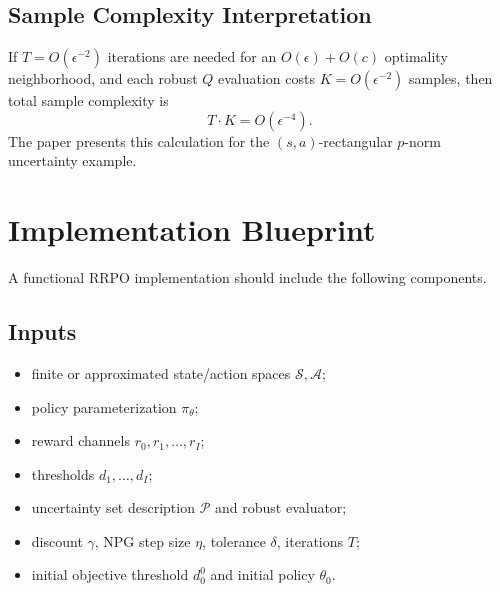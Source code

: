 \documentclass[11pt]{article}
\newcommand{\Sset}{\mathcal S}
\newcommand{\Aset}{\mathcal A}
\newcommand{\Pset}{\mathcal P}
\newcommand{\1}{\mathbf 1}
\begin{document}
\subsection{Sample Complexity Interpretation}
If $T=O(\epsilon^{-2})$ iterations are needed for an $O(\epsilon)+O(c)$ optimality neighborhood, and each robust $Q$ evaluation costs $K=O(\epsilon^{-2})$ samples, then total sample complexity is
\begin{equation}
    T\cdot K=O(\epsilon^{-4}).
\end{equation}
The paper presents this calculation for the $(s,a)$-rectangular $p$-norm uncertainty example.

\section{Implementation Blueprint}
A functional RRPO implementation should include the following components.

\subsection{Inputs}
\begin{itemize}[leftmargin=2em]
    \item finite or approximated state/action spaces $\Sset,\Aset$;
    \item policy parameterization $\pi_\theta$;
    \item reward channels $r_0,r_1,\ldots,r_I$;
    \item thresholds $d_1,\ldots,d_I$;
    \item uncertainty set description $\Pset$ and robust evaluator;
    \item discount $\gamma$, NPG step size $\eta$, tolerance $\delta$, iterations $T$;
    \item initial objective threshold $d_0^0$ and initial policy $\theta_0$.
\end{itemize}
\end{document}
